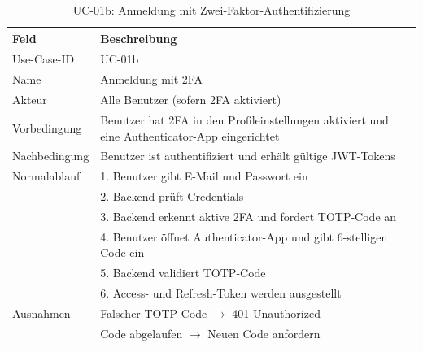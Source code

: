 \begin{table}[H]
    \centering
    \caption{UC-01b: Anmeldung mit Zwei-Faktor-Authentifizierung}
    \begin{tabularx}{\textwidth}{lX}
        \toprule
        \textbf{Feld} & \textbf{Beschreibung} \\
        \midrule
        Use-Case-ID   & UC-01b \\
        Name          & Anmeldung mit 2FA \\
        Akteur        & Alle Benutzer (sofern 2FA aktiviert) \\
        Vorbedingung  & Benutzer hat 2FA in den Profileinstellungen
                        aktiviert und eine Authenticator-App
                        eingerichtet \\
        Nachbedingung & Benutzer ist authentifiziert und erhält
                        gültige JWT-Tokens \\
        Normalablauf  & 1. Benutzer gibt E-Mail und Passwort ein \\
                      & 2. Backend prüft Credentials \\
                      & 3. Backend erkennt aktive 2FA und fordert
                           TOTP-Code an \\
                      & 4. Benutzer öffnet Authenticator-App und
                           gibt 6-stelligen Code ein \\
                      & 5. Backend validiert TOTP-Code \\
                      & 6. Access- und Refresh-Token werden ausgestellt \\
        Ausnahmen     & Falscher TOTP-Code $\rightarrow$ 401 Unauthorized \\
                      & Code abgelaufen $\rightarrow$ Neuen Code anfordern \\
        \bottomrule
    \end{tabularx}
    \label{tab:uc01b}
\end{table}
